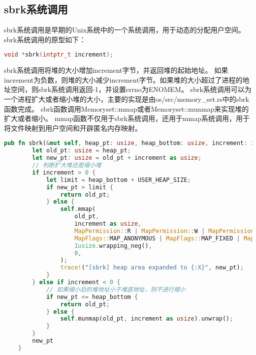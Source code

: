 \subsection{sbrk系统调用}
sbrk系统调用是早期的Unix系统中的一个系统调用，用于动态的分配用户空间。sbrk系统调用的原型如下：
\begin{lstlisting}[language=c]
    void *sbrk(intptr_t increment);
\end{lstlisting}
sbrk系统调用将堆的大小增加increment字节，并返回堆的起始地址。
如果increment为负数，则堆的大小减少increment字节。如果堆的大小超过了进程的地址空间，则sbrk系统调用返回-1，并设置errno为ENOMEM。
sbrk系统调用可以为一个进程扩大或者缩小堆的大小，主要的实现是由os/src/memory_set.rs中的sbrk函数完成。
sbrk函数调用Memoryset::mmap或者Memoryset::munmap来实现堆的扩大或者缩小。
mmap函数不仅用于sbrk系统调用，还用于mmap系统调用，用于将文件映射到用户空间和开辟匿名内存映射。
\begin{lstlisting}[language=rust]
    pub fn sbrk(&mut self, heap_pt: usize, heap_bottom: usize, increment: isize) -> usize {
        let old_pt: usize = heap_pt;
        let new_pt: usize = old_pt + increment as usize;
        // 判断扩大堆还是缩小堆
        if increment > 0 {
            let limit = heap_bottom + USER_HEAP_SIZE;
            if new_pt > limit {
                return old_pt;
            } else {
                self.mmap(
                    old_pt,
                    increment as usize,
                    MapPermission::R | MapPermission::W | MapPermission::U,
                    MapFlags::MAP_ANONYMOUS | MapFlags::MAP_FIXED | MapFlags::MAP_PRIVATE,
                    1usize.wrapping_neg(),
                    0,
                );
                trace!("[sbrk] heap area expanded to {:X}", new_pt);
            }
        } else if increment < 0 {
            // 如果缩小后的堆地址小于堆底地址，则不进行缩小
            if new_pt <= heap_bottom {
                return old_pt;
            } else {
                self.munmap(old_pt, increment as usize).unwrap();
            }
        }
        new_pt
    }
\end{lstlisting}